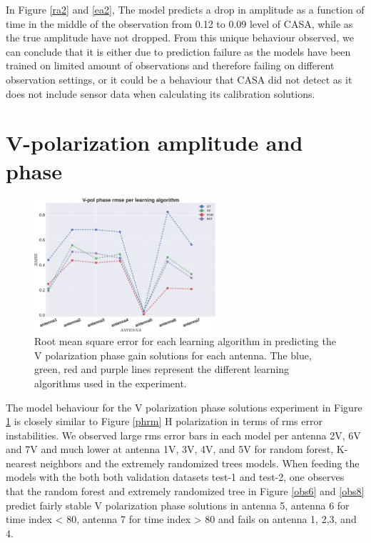 In Figure \ref{ra2} and \ref{ea2}, The model predicts a drop in amplitude as a function of time in the middle of the observation from 0.12 to 0.09 level of CASA, while as the true amplitude have not dropped. From this unique behaviour observed, we can conclude that it is either due to prediction failure as the models have been trained on limited amount of observations and therefore failing on different observation settings, or it could be a behaviour that CASA did not detect as it does not include sensor data when calculating its calibration solutions.
\section{V-polarization amplitude and phase}
\label{Vp}
\begin{figure}[H]
  \centering
    \includegraphics[width=0.6\textwidth]{images/Vpol-phase.eps}
    \caption{Root mean square error for each learning algorithm in predicting the V polarization phase gain solutions for each antenna. The blue, green, red and purple lines represent the different learning algorithms used in the experiment.}
  \label{phrmv}
 \end{figure}
 
The model behaviour for the V polarization phase solutions experiment in Figure \ref{phrmv} is closely similar to Figure \ref{phrm} H polarization in terms of rms error instabilities. We observed large rms error bars in each model per antenna 2V, 6V and 7V and much lower at antenna 1V, 3V, 4V, and 5V for random forest, K-nearest neighbors and the extremely randomized trees models. When feeding the models with the both both validation datasets test-1 and test-2, one observes that the random forest and extremely randomized tree in Figure \ref{obs6} and \ref{obs8} predict fairly stable V polarization phase solutions in antenna 5, antenna 6 for time index < 80, antenna 7 for time index > 80 and fails on antenna 1, 2,3, and 4.

